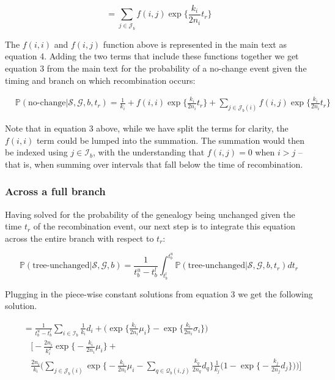 \documentclass[11pt]{article}
\begin{document}
\begin{equation}
	= \sum_{j \in \mathcal{J}_b} 
	f(i,j)
	\exp \bigg\{ \frac{k_i}{2n_i} t_r \bigg\}
\end{equation}


\noindent The $f(i,i)$ and $f(i,j)$ function above is represented in the main
text as equation 4. Adding the two terms that include these functions 
together we get equation 3 from the main text for the probability of a
no-change event given the timing and branch on which recombination occurs:

\begin{equation}\tag{3}
\begin{aligned}
	&\mathbb{P}(\text{no-change} | \mathcal{S},\mathcal{G},b,t_r) = 
	\frac{1}{k_i} + f(i,i) \exp \bigg\{\frac{k_i}{2n_i} t_r\bigg\} +
	\sum_{j \in \mathcal{J}_b(i)} f(i,j) \exp\bigg\{\frac{k_i}{2n_i}t_r\bigg\} 
\end{aligned}
\end{equation}

\noindent Note that in equation 3 above, while we have split the terms for clarity, 
the $f(i,i)$ term could be lumped into the summation. The summation would then be indexed 
using $j \in \mathcal{I}_b$, with the understanding that $f(i,j)=0$ when $i>j$ -- 
that is, when summing over intervals that fall below the time of recombination.


\subsubsection{Across a full branch}
Having solved for the probability of the genealogy being unchanged given the 
time $t_r$ of the recombination event, our next step is to integrate this equation
across the entire branch with respect to $t_r$:

\begin{equation}
	\mathbb{P}(\text{tree-unchanged} | \mathcal{S}, \mathcal{G}, b) = 
		\frac{1}{t_b^u - t_b^l} 
		\int_{t_b^l}^{t_b^u} 
		\mathbb{P}(\text{tree-unchanged} | \mathcal{S}, \mathcal{G}, b, t_r) dt_r
\end{equation}

\noindent Plugging in the piece-wise constant solutions from equation 3
we get the following solution.

\begin{equation}
\begin{aligned}
	&= \frac{1}{t^u_b-t^l_b}
	\sum_{i \in \mathcal{I}_b}
	\frac{1}{k_i}d_i + 
	\bigg(
		\exp \bigg\{ \frac{k_i}{2n_i} \mu_{i} \bigg\}
		-\exp \bigg\{ \frac{k_i}{2n_i} \sigma_i	\bigg\}
	\bigg)\\
	&~~~~\Bigg[
		-\frac{2n_i}{k_i^2}
		\exp \bigg\{ -\frac{k_i}{2n_i} \mu_{i} \bigg\} + 
		\\
		&~~~~\frac{2n_i}{k_i}
		\Bigg(
			\sum_{j \in \mathcal{J}_b(i)}
			\exp \bigg\{
				-\frac{k_i}{2n_i} \mu_{i} -
				\sum_{q \in \mathcal{Q}_b(i,j)}
				\frac{k_q}{2n_q} d_q
				\bigg\}
			\frac{1}{k_j} \bigg(1- \exp \bigg\{-\frac{k_j}{2n_j} d_j \bigg\} \bigg)
		\Bigg)
	\Bigg]
\end{aligned}
\end{equation}
\end{document}
